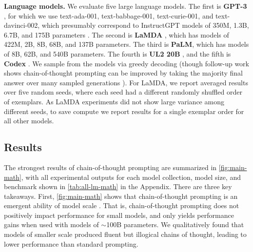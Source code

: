 \documentclass[]{article}
\theoremstyle{plain}
\theoremstyle{definition}
\theoremstyle{remark}
\newcommand{\lamda}[0]{LaMDA}
\newcommand{\palm}[0]{PaLM}
\begin{document}
\textbf{Language models.}
We evaluate five large language models.
The first is \textbf{GPT-3} \citep{brown2020language}, for which we use text-ada-001, text-babbage-001, text-curie-001, and text-davinci-002, which presumably correspond to InstructGPT models of 350M, 1.3B, 6.7B, and 175B parameters \citep{ouyang2022training}.%
The second is \textbf{\lamda{}} \citep{thoppilan2022lamda}, which has models of 422M, 2B, 8B, 68B, and 137B parameters. %
The third is \textbf{\palm{}}, which has models of 8B, 62B, and 540B parameters.
The fourth is \textbf{UL2 20B} \citep{tay2022unifying}, and the fifth is \textbf{Codex} \citep[][code-davinci-002 in the OpenAI API]{chen2021evaluating}.
We sample from the models via greedy decoding (though follow-up work shows chain-of-thought prompting can be improved by taking the majority final answer over many sampled generations \citep{wang2022self}).
For \lamda{}, we report averaged results over five random seeds, where each seed had a different randomly shuffled order of exemplars.
As \lamda{} experiments did not show large variance among different seeds, to save compute we report results for a single exemplar order for all other models.

\subsection{Results}
The strongest results of chain-of-thought prompting are summarized in \cref{fig:main-math}, with all experimental outputs for each model collection, model size, and benchmark shown in \cref{tab:all-lm-math} in the Appendix.
There are three key takeaways.
First, \cref{fig:main-math} shows that chain-of-thought prompting is an emergent ability of model scale \citep{wei2022emergent}. 
That is, chain-of-thought prompting does not positively impact performance for small models, and only yields performance gains when used with models of $\sim$100B parameters.
We qualitatively found that models of smaller scale produced fluent but illogical chains of thought, leading to lower performance than standard prompting.
\end{document}
